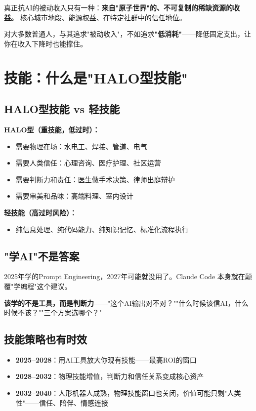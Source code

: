 \documentclass[a4paper,12pt,UTF8]{ctexart}
\begin{document}
真正抗AI的被动收入只有一种：\textbf{来自"原子世界"的、不可复制的稀缺资源的收益。} 核心城市地段、能源权益、在特定社群中的信任地位。

对大多数普通人，与其追求"被动收入"，不如追求\textbf{"低消耗"}——降低固定支出，让你在收入下降时也能撑住。

\section{技能：什么是"HALO型技能"}

\subsection{HALO型技能 vs 轻技能}

\textbf{HALO型（重技能，低过时）：}
\begin{itemize}
\item 需要物理在场：水电工、焊接、管道、电气
\item 需要人类信任：心理咨询、医疗护理、社区运营
\item 需要判断力和责任：医生做手术决策、律师出庭辩护
\item 需要审美和品味：高端料理、室内设计
\end{itemize}

\textbf{轻技能（高过时风险）：}
\begin{itemize}
\item 纯信息处理、纯代码能力、纯知识记忆、标准化流程执行
\end{itemize}

\subsection{"学AI"不是答案}

2025年学的Prompt Engineering，2027年可能就没用了。Claude Code 本身就在颠覆"学编程"这个建议。

\textbf{该学的不是工具，而是判断力}——"这个AI输出对不对？""什么时候该信AI，什么时候不该？""三个方案选哪个？"

\subsection{技能策略也有时效}

\begin{itemize}
\item \textbf{2025--2028}：用AI工具放大你现有技能——最高ROI的窗口
\item \textbf{2028--2032}：物理技能增值，判断力和信任关系变成核心资产
\item \textbf{2032--2040}：人形机器人成熟，物理技能窗口也关闭，价值可能只剩"人类性"——信任、陪伴、情感连接
\end{itemize}
\end{document}
